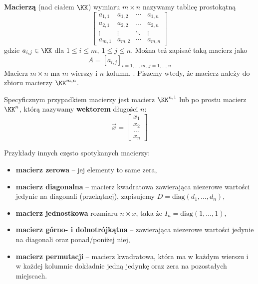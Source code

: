\textbf{Macierzą} (nad ciałem $\KK$) wymiaru $m \times n$ nazywamy tablicę prostokątną 
$$
\begin{bmatrix}
    a_{1,1} & a_{1,2} & \cdots & a_{1,n} \\
    a_{2,1} & a_{2,2} & \dots & a_{2,n} \\
    \vdots & \vdots & \ddots & \vdots \\
    a_{m,1} & a_{m,2} & \cdots & a_{m,n}     
\end{bmatrix}
$$
gdzie $a_{i,j} \in \KK$ dla $1 \leq i \leq m, \ 1 \leq j \leq n$. Można też zapisać taką macierz jako $$
A=[a_{i,j}]_{i=1,\dots,m, \ j=1,\dots,n}
$$
Macierz $m\times n$ ma $m$ wierszy i $n$ kolumn. . Piszemy wtedy, że macierz należy do zbioru macierzy $\KK^{m, n}$.

Specyficznym przypadkiem macierzy jest macierz $\KK^{n, 1}$ lub po prostu macierz $\KK^n$, którą nazywamy \textbf{wektorem} długości $n$:
$$
\vec{x} = \begin{bmatrix}
    x_1 \\ x_2 \\ \dots \\ x_n
\end{bmatrix}
$$

Przykłady innych często spotykanych macierzy:
\begin{itemize}
    \item \textbf{macierz zerowa} -- jej elementy to same zera,
    \item \textbf{macierz diagonalna} -- macierz kwadratowa zawierająca niezerowe wartości jedynie na diagonali (przekątnej), zapisujemy $D=\text{diag}(d_1,\dots, d_n)$,
    \item \textbf{macierz jednostkowa} rozmiaru $n \times x$, taka że $I_n=\text{diag}(1, \dots, 1)$,
    \item \textbf{macierz górno- i dolnotrójkątna} -- zawierająca niezerowe wartości jedynie na diagonali oraz ponad/poniżej niej,
    \item \textbf{macierz permutacji} -- macierz kwadratowa, która ma w każdym wierszu i w każdej kolumnie dokładnie jedną jedynkę oraz zera na pozostałych miejscach.
\end{itemize}

